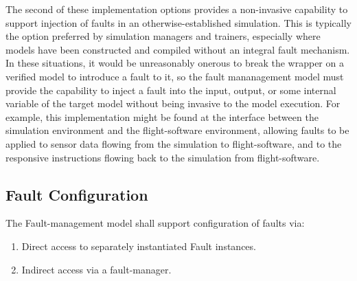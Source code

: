 \documentclass[11pt,fleqn]{report}
\begin{document}
The second of these implementation options provides a non-invasive capability
to support injection of faults in an otherwise-established simulation. This is
typically the option preferred by simulation managers and trainers, especially
where models have been constructed and compiled without an
integral fault mechanism. In these situations, it would be unreasonably onerous
to break the wrapper on a verified model to introduce a fault to it, so the
fault mananagement model must provide the capability to inject a fault into
the input, output, or some internal variable of the target model without being
invasive to the model execution. For example,
this implementation might be found at the interface between the simulation
environment and the flight-software environment, allowing faults to be applied
to sensor data flowing from the simulation to flight-software, and to the
responsive instructions flowing back to the simulation from flight-software.

\subsection {Fault Configuration}
The Fault-management model shall support configuration of faults via:
\begin{enumerate}
 \item Direct access to separately instantiated Fault instances.
 \item Indirect access via a fault-manager.
\end{enumerate}
\end{document}
